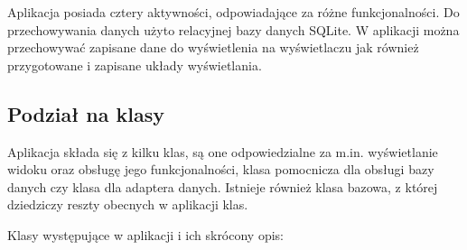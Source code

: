 \documentclass[a4paper,12pt, twoside]{article}
\begin{document}
	Aplikacja posiada cztery aktywności, odpowiadające za różne funkcjonalności. Do przechowywania danych użyto relacyjnej bazy danych SQLite. W aplikacji można przechowywać zapisane dane do wyświetlenia na wyświetlaczu jak również przygotowane i zapisane układy wyświetlania.
	
	\subsection{Podział na klasy}
	Aplikacja składa się z kilku klas, są one odpowiedzialne za m.in. wyświetlanie widoku oraz obsługę jego funkcjonalności, klasa pomocnicza dla obsługi bazy danych czy klasa dla adaptera danych. Istnieje również klasa bazowa, z której dziedziczy reszty obecnych w aplikacji klas.
	
	Klasy występujące w aplikacji i ich skrócony opis:
\end{document}

